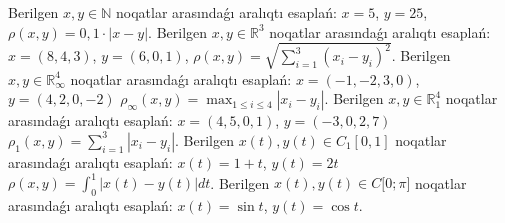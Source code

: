 Berilgen \(x,y\mathbb{\in N}\) noqatlar arasındaǵı aralıqtı esaplań: \(x = 5\), \(y = 25\), \(\rho(x,y) = 0,1 \cdot |x - y|\).
Berilgen \(x,y \in \mathbb{R}^{3}\) noqatlar arasındaǵı aralıqtı esaplań: \(x = (8,4,3)\), \(y = (6,0,1)\), \(\rho(x,y) = \sqrt{{\sum_{i = 1}^{3}\left( x_{i} - y_{i} \right)^{2}}}\).
Berilgen \(x,y \in \mathbb{R}_{\infty}^{4}\) noqatlar arasındaǵı aralıqtı esaplań: \(x = ( - 1, - 2,3,0)\), \(y = (4,2,0, - 2)\) \(\rho_{\infty}(x,y) = \max_{1 \leq i \leq 4}\left| x_{i} - y_{i} \right|\).
Berilgen \(x,y \in \mathbb{R}_1^{4}\) noqatlar arasındaǵı aralıqtı esaplań: \(x = (4,5,0,1)\), \(y = ( - 3,0,2,7)\) \(\rho_{1}(x,y) = \sum_{i = 1}^{3}\left| x_{i} - y_{i} \right|\).
Berilgen \(x(t),y(t)\in C_1[0,1]\) noqatlar arasındaǵı aralıqtı esaplań: \(x(t) = 1 + t\), \(y(t) = 2t\) \(\rho(x,y) = \int_{0}^{1}{\left| x(t) - y(t) \right|dt}\).
Berilgen \(x(t),y(t) \in C\lbrack 0;\pi\rbrack\) noqatlar arasındaǵı aralıqtı esaplań: \(x(t) = \sin t\), \(y(t) = \cos t\).